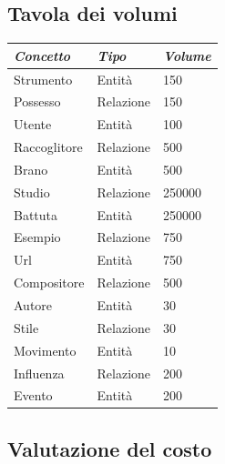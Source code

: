 \documentclass{article}
\begin{document}
    \subsection{Tavola dei volumi}

    \begin{center}
        \begin{tabular}{lll}
            \toprule
            \textbf{\textit{Concetto}} & \textbf{\textit{Tipo}} & \textbf{\textit{Volume}}\\
            \midrule
            Strumento & Entità & 150\\
            \midrule
            Possesso & Relazione & 150\\
            \midrule
            Utente & Entità & 100\\
            \midrule
            Raccoglitore & Relazione & 500\\
            \midrule
            Brano &  Entità & 500\\
            \midrule
            Studio & Relazione & 250000\\
            \midrule
            Battuta &  Entità & 250000\\
            \midrule
            Esempio & Relazione & 750\\
            \midrule
            Url &  Entità & 750\\
            \midrule
            Compositore & Relazione & 500\\
            \midrule
            Autore &  Entità & 30\\
            \midrule
            Stile & Relazione & 30\\
            \midrule
            Movimento &  Entità & 10\\
            \midrule
            Influenza & Relazione & 200\\
            \midrule
            Evento &  Entità & 200\\
            \bottomrule
        \end{tabular}
    \end{center}

    \subsection{Valutazione del costo}
\end{document}
